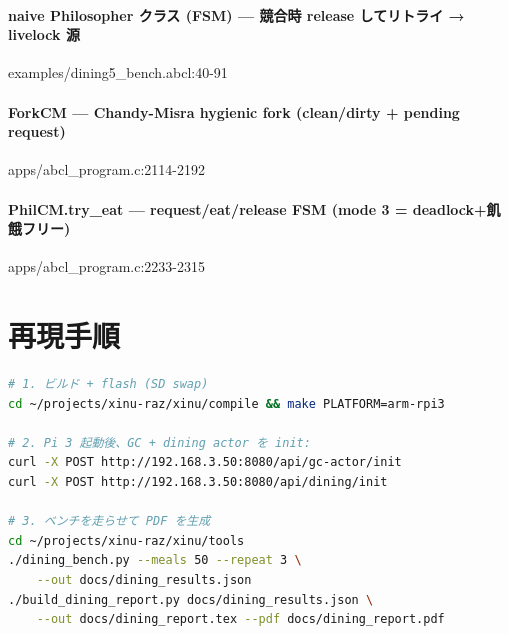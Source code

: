 \documentclass[a4paper,11pt]{ltjsarticle}
\begin{document}
\paragraph{naive Philosopher クラス (FSM) — 競合時 release してリトライ → livelock 源}\nopagebreak\par
{\footnotesize\ttfamily examples/dining5\_bench.abcl:40-91}\nopagebreak


\paragraph{ForkCM — Chandy-Misra hygienic fork (clean/dirty + pending request)}\nopagebreak\par
{\footnotesize\ttfamily apps/abcl\_program.c:2114-2192}\nopagebreak


\paragraph{PhilCM.try\_eat — request/eat/release FSM (mode 3 = deadlock+飢餓フリー)}\nopagebreak\par
{\footnotesize\ttfamily apps/abcl\_program.c:2233-2315}\nopagebreak



\section{再現手順}

\begin{lstlisting}[language=bash]
# 1. ビルド + flash (SD swap)
cd ~/projects/xinu-raz/xinu/compile && make PLATFORM=arm-rpi3

# 2. Pi 3 起動後、GC + dining actor を init:
curl -X POST http://192.168.3.50:8080/api/gc-actor/init
curl -X POST http://192.168.3.50:8080/api/dining/init

# 3. ベンチを走らせて PDF を生成
cd ~/projects/xinu-raz/xinu/tools
./dining_bench.py --meals 50 --repeat 3 \
    --out docs/dining_results.json
./build_dining_report.py docs/dining_results.json \
    --out docs/dining_report.tex --pdf docs/dining_report.pdf
\end{lstlisting}
\end{document}
